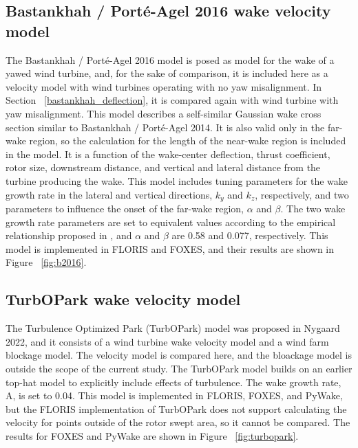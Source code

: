 \documentclass{iopconfser}
\begin{document}
\subsection{Bastankhah / Porté-Agel 2016 wake velocity model} \label{bastankhah_velocity}
The Bastankhah / Porté-Agel 2016 model is posed as model for the wake of a yawed wind turbine, and, for the sake of comparison, it is included here as a velocity model with wind turbines operating with no yaw misalignment.
In Section ~\ref{bastankhah_deflection}, it is compared again with wind turbine with yaw misalignment.
This model describes a self-similar Gaussian wake cross section similar to Bastankhah / Porté-Agel 2014.
It is also valid only in the far-wake region, so the calculation for the length of the near-wake region is included in the model.
It is a function of the wake-center deflection, thrust coefficient, rotor size, downstream distance, and vertical and lateral distance from the turbine producing the wake.
This model includes tuning parameters for the wake growth rate in the lateral and vertical directions, $k_{y}$ and $k_{z}$, respectively, and two parameters to influence the onset of the far-wake region, $\alpha$ and $\beta$.
The two wake growth rate parameters are set to equivalent values according to the empirical relationship proposed in \cite{niayifar2016analytical}, and $\alpha$ and $\beta$ are 0.58 and 0.077, respectively.
This model is implemented in FLORIS and FOXES, and their results are shown in Figure ~\ref{fig:b2016}.

\subsection{TurbOPark wake velocity model}
The Turbulence Optimized Park (TurbOPark) model was proposed in Nygaard 2022, and it consists of a wind turbine wake velocity model and a wind farm blockage model.
The velocity model is compared here, and the bloackage model is outside the scope of the current study.
The TurbOPark model builds on an earlier top-hat model to explicitly include effects of turbulence.
The wake growth rate, A, is set to 0.04.
This model is implemented in FLORIS, FOXES, and PyWake, but the FLORIS implementation of TurbOPark does not support calculating the velocity for points outside of the rotor swept area, so it cannot be compared.
The results for FOXES and PyWake are shown in Figure ~\ref{fig:turbopark}.
\end{document}
